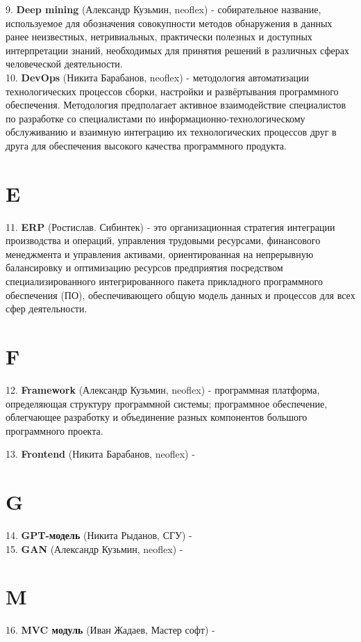 \documentclass[14 pt]{extarticle}
\begin{document}
    9. \textbf{Deep mining} (Александр Кузьмин, neoflex) - собирательное название, используемое для обозначения совокупности методов обнаружения в данных ранее неизвестных, нетривиальных, практически полезных и доступных интерпретации знаний, необходимых для принятия решений в различных сферах человеческой деятельности. \\

    10. \textbf{DevOps} (Никита Барабанов, neoflex) - методология автоматизации технологических процессов сборки, настройки и развёртывания программного обеспечения. Методология предполагает активное взаимодействие специалистов по разработке со специалистами по информационно-технологическому обслуживанию и взаимную интеграцию их технологических процессов друг в друга для обеспечения высокого качества программного продукта.

\section*{E}
    11. \textbf{ERP} (Ростислав. Сибинтек) - это организационная стратегия интеграции производства и операций, управления трудовыми ресурсами, финансового менеджмента и управления активами, ориентированная на непрерывную балансировку и оптимизацию ресурсов предприятия посредством специализированного интегрированного пакета прикладного программного обеспечения (ПО), обеспечивающего общую модель данных и процессов для всех сфер деятельности.

\section*{F}
    12. \textbf{Framework} (Александр Кузьмин, neoflex) - программная платформа, определяющая структуру программной системы; программное обеспечение, облегчающее разработку и объединение разных компонентов большого программного проекта.
    
    13. \textbf{Frontend} (Никита Барабанов, neoflex) - \\

\section*{G}
    14. \textbf{GPT-модель} (Никита Рыданов, СГУ) - \\
    
    15. \textbf{GAN} (Александр Кузьмин, neoflex) - \\
    
\section*{M}
    16. \textbf{MVC модуль} (Иван Жадаев, Мастер софт) -  \\
    
\end{document}
